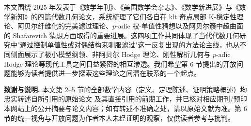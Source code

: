 \documentclass[11pt,a4paper]{article}
\theoremstyle{definition}
\theoremstyle{remark}
\begin{document}
本文围绕 2025 年发表于《数学年刊》、《美国数学会杂志》、《数学新进展》与《数学新知》的四篇代数几何论文，系统梳理了它们各自在 klt 奇点局部 K-稳定性理论、阿贝尔纤维化的完美滤过理论、$p$-adic 权-单值性猜想以及阿贝尔簇中超曲面的 Shafarevich 猜想方面取得的重要进展。这四项工作共同体现了当代代数几何研究中"通过控制单值性或对偶结构来驯服滤过"这一反复出现的方法论主线，也从不同侧面展示了极小模型纲领、非阿贝尔 Hodge 理论、刚性解析几何与 $p$-adic Hodge 理论等现代工具之间日益紧密的相互渗透。我们希望第 6 节提出的开放问题能够为读者提供进一步探索这些理论之间潜在联系的一个起点。

\bigskip
\noindent\textbf{致谢与说明.} 本文第 2--5 节的全部数学内容（定义、定理陈述、证明策略概述）均忠实转述自所引用的原始论文 \cite{XZ2025,MSY2025,BKV2025,LS2025} 及其直接引用的前期工作，并已核对相应期刊/预印本网站上的公开摘要与论文内容；如有转述不准确之处，请以原始文献为准。第 6 节的统一视角与开放问题为作者本人未经证明的观察，仅供读者参考与批判。
\end{document}
